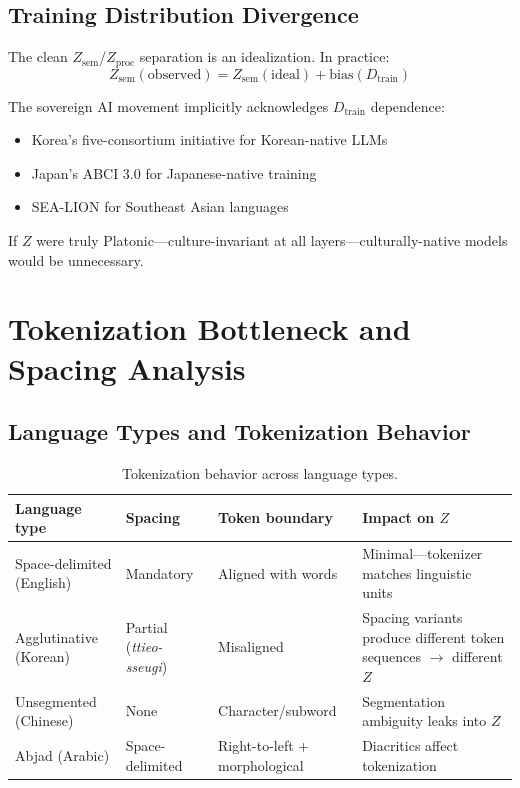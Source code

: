 \documentclass[11pt]{article}
\theoremstyle{definition}
\newcommand{\Zsem}{Z_{\text{sem}}}
\newcommand{\Zproc}{Z_{\text{proc}}}
\newcommand{\Dtrain}{D_{\text{train}}}
\begin{document}
\subsection{Training Distribution Divergence}

The clean $\Zsem$/$\Zproc$ separation is an idealization. In practice:
\[
\Zsem(\text{observed}) = \Zsem(\text{ideal}) + \mathrm{bias}(\Dtrain)
\]

The sovereign AI movement implicitly acknowledges $\Dtrain$ dependence:
\begin{itemize}[nosep]
  \item Korea's five-consortium initiative for Korean-native LLMs
  \item Japan's ABCI 3.0 for Japanese-native training
  \item SEA-LION for Southeast Asian languages
\end{itemize}
If $Z$ were truly Platonic---culture-invariant at all layers---culturally-native models would be unnecessary.

\section{Tokenization Bottleneck and Spacing Analysis}\label{app:tokenization}

\subsection{Language Types and Tokenization Behavior}

\begin{table}[h]
\centering
\caption{Tokenization behavior across language types.}
\label{tab:tokenization}
\small
\begin{tabularx}{\textwidth}{l l l L}
\toprule
\textbf{Language type} & \textbf{Spacing} & \textbf{Token boundary} & \textbf{Impact on $Z$} \\
\midrule
Space-delimited (English) & Mandatory & Aligned with words & Minimal---tokenizer matches linguistic units \\
Agglutinative (Korean) & Partial (\emph{ttieo-sseugi}) & Misaligned & Spacing variants produce different token sequences $\to$ different $Z$ \\
Unsegmented (Chinese) & None & Character/subword & Segmentation ambiguity leaks into $Z$ \\
Abjad (Arabic) & Space-delimited & Right-to-left + morphological & Diacritics affect tokenization \\
\bottomrule
\end{tabularx}
\end{table}
\end{document}
